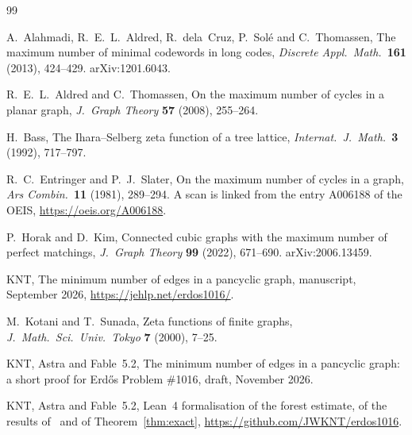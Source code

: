 \documentclass[11pt]{article}
\begin{document}
\contentsblock











\begin{thebibliography}{99}\small

 A.~Alahmadi, R.~E.~L.~Aldred, R.~dela~Cruz, P.~Sol\'e and C.~Thomassen, The maximum
number of minimal codewords in long codes, \emph{Discrete Appl.\ Math.}\ \textbf{161} (2013),
424--429. arXiv:1201.6043.

 R.~E.~L.~Aldred and C.~Thomassen, On the maximum number of cycles in a planar graph,
\emph{J.~Graph Theory} \textbf{57} (2008), 255--264.

 H.~Bass, The Ihara--Selberg zeta function of a tree lattice, \emph{Internat.\
J.~Math.}\ \textbf{3} (1992), 717--797.

 R.~C.~Entringer and P.~J.~Slater, On the maximum number of cycles in a graph,
\emph{Ars Combin.}\ \textbf{11} (1981), 289--294. A scan is linked from the entry A006188 of the
OEIS, \url{https://oeis.org/A006188}.

 P.~Horak and D.~Kim, Connected cubic graphs with the maximum number of perfect
matchings, \emph{J.~Graph Theory} \textbf{99} (2022), 671--690. arXiv:2006.13459.

 KNT, The minimum number of edges in a pancyclic graph, manuscript, September 2026,
\url{https://jehlp.net/erdos1016/}.

 M.~Kotani and T.~Sunada, Zeta functions of finite graphs, \emph{J.~Math.\ Sci.\ Univ.\
Tokyo} \textbf{7} (2000), 7--25.

 KNT, Astra and Fable~5.2, The minimum number of edges in a pancyclic graph: a short
proof for Erd\H{o}s Problem \#1016, draft, November 2026.

 KNT, Astra and Fable~5.2, Lean~4 formalisation of the forest estimate, of the
results of~\cite{KNT} and of Theorem~\ref{thm:exact}, \url{https://github.com/JWKNT/erdos1016}.

\end{thebibliography}
\end{document}
